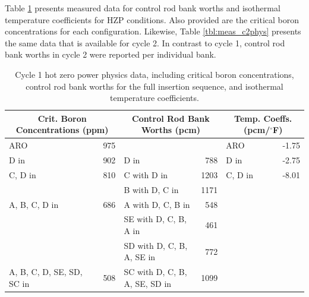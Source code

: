 Table \ref{tbl:meas_c1phys} presents measured data for control rod bank worths
and isothermal temperature coefficients for \ac{HZP} conditions. Also provided
are the critical boron concentrations for each configuration. Likewise, Table
\ref{tbl:meas_c2phys} presents the same data that is available for cycle 2. In
contrast to cycle 1, control rod bank worths in cycle 2 were reported per
individual bank.

\begin{table}[htp]
  \centering
  \caption[Cycle 1 hot zero power physics data.]{Cycle 1 hot zero power physics
  data, including critical boron concentrations, control rod bank worths for the
  full insertion sequence, and isothermal temperature coefficients.
  \label{tbl:meas_c1phys}}
  \begin{tabular}{l r l r l r}
    \toprule 
    \multicolumn{2}{c}{Crit. Boron Concentrations (\acs{ppm})} &
    \multicolumn{2}{c}{Control Rod Bank Worths (\acs{pcm})} &
    \multicolumn{2}{c}{Temp. Coeffs. (\acs{pcm}/$^\circ$F)}\\
    \midrule
    \midrule

    \ac{ARO} & 975 &  &  & \ac{ARO} & -1.75 \\
    D in & 902 & D in & 788 & D in & -2.75 \\
    C, D in & 810 & C with D in & 1203 & C, D in & -8.01 \\
    &  & B with D, C in & 1171 & & \\
    A, B, C, D in & 686 & A with D, C, B in & 548 & & \\
    &  & SE with D, C, B, A in & 461 & & \\
    &  & SD with D, C, B, A, SE in & 772 & & \\
    A, B, C, D, SE, SD, SC in &  508 & SC with D, C, B, A, SE, SD in & 1099 & & \\
    \bottomrule
  \end{tabular}
\end{table}


